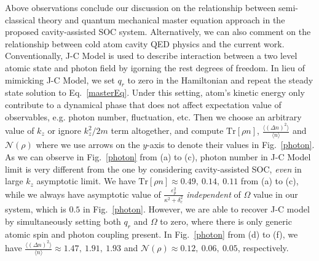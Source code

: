 \documentclass[atoms,article,submit,moreauthors,pdftex,12pt,a4paper]{mdpi}
\begin{document}

Above observations conclude our discussion on the relationship between semi-classical theory and quantum mechanical master equation approach in the proposed cavity-assisted SOC system. Alternatively, we can also comment on the relationship between cold atom cavity QED physics and the current work. Conventionally, J-C Model is used to describe interaction between a two level atomic state and photon field by igorning the rest degrees of freedom. In lieu of mimicking J-C Model, we set $q_r$ to zero in the Hamiltonian and repeat the steady state solution to Eq.~\ref{masterEq}. Under this setting, atom's kinetic energy only contribute to a dynamical phase that does not affect expectation value of observables, e.g. photon number, fluctuation, etc. Then we choose an arbitrary value of $k_z$ or ignore $k_z^2/2m$ term altogether, and compute $\text{Tr}[\rho n]$, $\frac{\langle(\Delta n)^{2}\rangle}{\langle n\rangle}$ and $\mathcal{N}(\rho)$ where we use arrows on the $y$-axis to denote their values in Fig.~\ref{photon}. As we can observe in Fig.~\ref{photon} from (a) to (c), photon number in J-C Model limit is very different from the one by considering cavity-assisted SOC, {\em even} in large $k_z$ asymptotic limit. We have $\text{Tr}[\rho n] \approx 0.49,\ 0.14,\ 0.11$ from (a) to (c), while we always have asymptotic value of $\frac{\varepsilon_p^2}{\kappa^2+\delta_c^2}$ {\em independent} of $\Omega$ value in our system, which is $0.5$ in Fig.~\ref{photon}. However, we are able to recover J-C model by simultaneously setting both $q_r$ and $\Omega$ to zero, where there is only generic atomic spin and photon coupling present. In Fig.~\ref{photon} from (d) to (f), we have $\frac{\langle(\Delta n)^{2}\rangle}{\langle n\rangle}\approx1.47,\ 1.91,\ 1.93$ and $\mathcal{N}(\rho)\approx 0.12,\ 0.06,\ 0.05$, respectively.    
\end{document}
